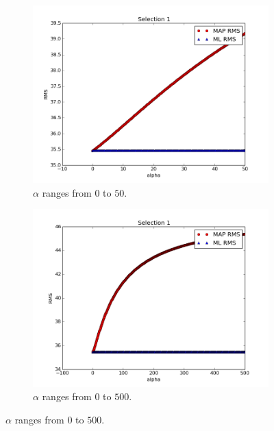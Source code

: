 \documentclass[a4paper]{article}
\begin{document}
\begin{figure}[H]
  \begin{adjustwidth}{-7em}{-7em}
    \centering
    \begin{subfigure}{.32\linewidth}
      \includegraphics[width=\linewidth]{figures/alpha_vs_rms_selection1a.png}
      \caption{$\alpha$ ranges from $0$ to $50$.}
      \label{fig:alpha_vs_rms_selection1a}
    \end{subfigure}
    \begin{subfigure}{.32\linewidth}
      \includegraphics[width=\linewidth]{figures/alpha_vs_rms_selection1b.png}
      \caption{$\alpha$ ranges from $0$ to $500$.}
      \label{fig:alpha_vs_rms_selection1b}
    \end{subfigure}

\end{adjustwidth}
\end{figure}
\end{document}
